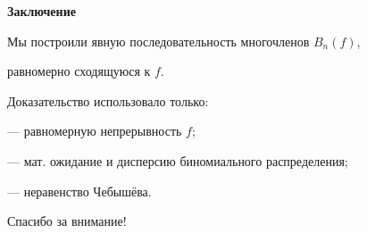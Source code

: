 \documentclass[11pt]{article}
\begin{document}
\newpage

\begin{center}
{\color{notaeYELLOW}\bfseries\fontsize{44}{52}\selectfont Заключение}
\end{center}
\vspace*{\fill}
\begin{center}
\fontsize{36}{43}\selectfont
Мы построили явную последовательность многочленов $B_n(f)$,\par\vspace{0.4in}
равномерно сходящуюся к $f$.\par\vspace{0.4in}
Доказательство использовало только:\par\vspace{0.4in}
— равномерную непрерывность $f$;\par\vspace{0.4in}
— мат. ожидание и дисперсию биномиального распределения;\par\vspace{0.4in}
— неравенство Чебышёва.\par\vspace{0.4in}
\end{center}
\vspace*{\fill}

\newpage

\vspace*{\fill}
\begin{center}
\fontsize{36}{43}\selectfont
\Huge Спасибо за внимание!\par\vspace{0.4in}
\end{center}
\vspace*{\fill}

\newpage
\end{document}
